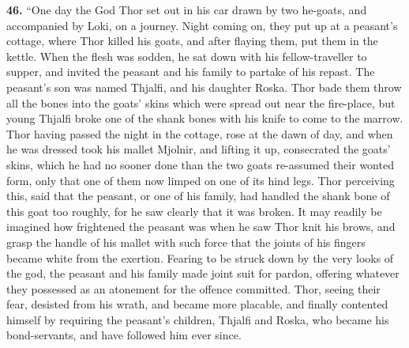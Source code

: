 \textbf{46.} ``One day the God Thor set out in his car drawn by two he-goats,
and accompanied by Loki, on a journey. Night coming on, they put up at
a peasant's cottage, where Thor killed his goats, and after flaying
them, put them in the kettle. When the flesh was sodden, he sat down
with his fellow-traveller to supper, and invited the peasant and his
family to partake of his repast. The peasant's son was named Thjalfi,
and his daughter Roska. Thor bade them throw all the bones into the
goats' skins which were spread out near the fire-place, but young
Thjalfi broke one of the shank bones with his knife to come to the
marrow. Thor having passed the night in the cottage, rose at the dawn
of day, and when he was dressed took his mallet Mjolnir, and lifting
it up, consecrated the goats' skins, which he had no sooner done than
the two goats re-assumed their wonted form, only that one of them now
limped on one of its hind legs. Thor perceiving this, said that the
peasant, or one of his family, had handled the shank bone of this goat
too roughly, for he saw clearly that it was broken. It may readily be
imagined how frightened the peasant was when he saw Thor knit his
brows, and grasp the handle of his mallet with such force that the
joints of his fingers became white from the exertion. Fearing to be
struck down by the very looks of the god, the peasant and his family
made joint suit for pardon, offering whatever they possessed as an
atonement for the offence committed. Thor, seeing their fear, desisted
from his wrath, and became more placable, and finally contented
himself by requiring the peasant's children, Thjalfi and Roska, who
became his bond-servants, and have followed him ever since.

